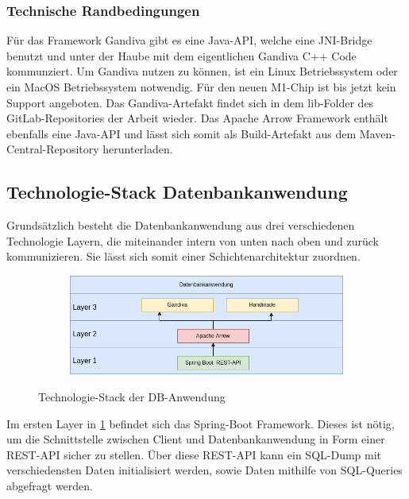 \subsubsection{Technische Randbedingungen}
Für das Framework Gandiva gibt es eine Java-API, welche eine JNI-Bridge benutzt und unter der Haube mit dem eigentlichen Gandiva C++ Code kommunziert.
Um Gandiva nutzen zu können, ist ein Linux Betriebssystem oder ein MacOS Betriebssystem notwendig. Für den neuen M1-Chip ist bis jetzt kein Support angeboten. Das Gandiva-Artefakt findet sich in dem lib-Folder des GitLab-Repositories der Arbeit wieder.\cite{Gitlab:hhu}
Das Apache Arrow Framework enthält ebenfalls eine Java-API und lässt sich somit als Build-Artefakt aus dem Maven-Central-Repository herunterladen.


\subsection{Technologie-Stack Datenbankanwendung}

Grundsätzlich besteht die Datenbankanwendung aus drei verschiedenen Technologie Layern, die miteinander intern von unten nach oben und zurück kommunizieren. Sie lässt sich somit einer Schichtenarchitektur zuordnen. 


\begin{figure}[h]
  \centering
  \begin{subfigure}[b]{1.0\textwidth}
    \includegraphics[width=1.0\linewidth]{img/layerarch}
  \end{subfigure}
  \caption{Technologie-Stack der DB-Anwendung}
  \label{graf_1}
\end{figure}

Im ersten Layer in \ref{graf_1} befindet sich das Spring-Boot Framework.
Dieses ist nötig, um die Schnittstelle zwischen Client und Datenbankanwendung in Form einer REST-API sicher zu stellen. 
Über diese REST-API kann ein SQL-Dump mit verschiedensten Daten initialisiert werden, sowie Daten mithilfe von SQL-Queries abgefragt werden.

